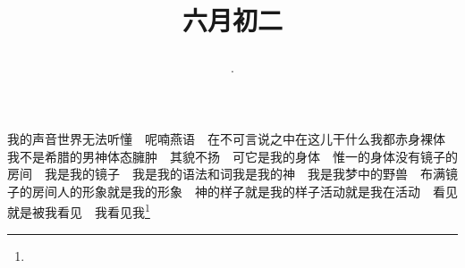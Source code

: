\title{\date[d=7,m=7,y=2024][year:cn-y,年,month:cn,day:cn,日,·,weekday]·六月初二 }
我的声音世界无法听懂　呢喃燕语　在不可言说之中在这儿干什么我都赤身裸体　我不是希腊的男神体态臃肿　其貌不扬　可它是我的身体　惟一的身体没有镜子的房间　我是我的镜子　我是我的语法和词我是我的神　我是我梦中的野兽　布满镜子的房间人的形象就是我的形象　神的样子就是我的样子活动就是我在活动　看见就是被我看见　我看见我\footnote{ }

